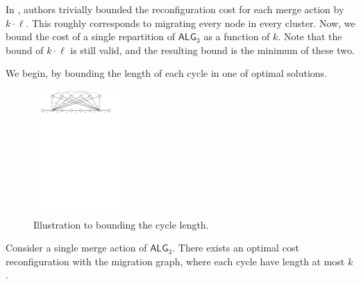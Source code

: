 \documentclass[manuscript,screen=true, review, anonymous]{acmart}
\newcommand{\TAlg}{{\ensuremath{\textsf{ALG}_{3}}}\xspace}
\begin{document}
In \cite{repartition-disc}, authors trivially bounded the reconfiguration cost for each merge action by $k \cdot \ell$.
This roughly corresponds to migrating every node in every cluster.
Now, we bound the cost of a single repartition of \TAlg as a function of $k$.
Note that the bound of $k \cdot \ell$ is still valid, and the resulting bound is the minimum of these two.

We begin, by bounding the length of each cycle in one of optimal solutions.


\begin{figure}[H]
  \centering
    \includegraphics[width=0.3\textwidth]{figs/substitute}
    \caption{Illustration to bounding the cycle length.}
    \label{fig:cascade-illustration}
  \end{figure}

\begin{theorem}
  \label{th:cascade-cycles}
  Consider a single merge action of \TAlg.
  There exists an optimal cost reconfiguration with the migration graph, where each cycle have length at most $k$.
\end{theorem}
\end{document}
